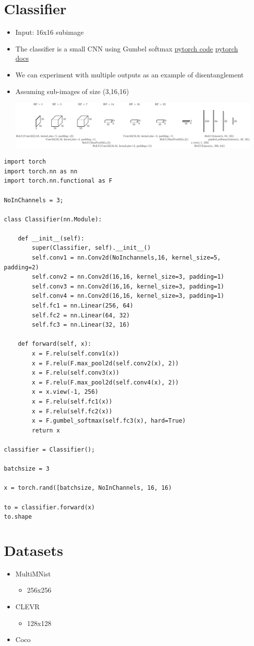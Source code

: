 \documentclass[11pt]{article}
\begin{document}
\section{Classifier}
\label{sec:orgf39c126}
\begin{itemize}
\item Input: 16x16 subimage
\item The classifier is a small CNN using Gumbel softmax
\href{https://pytorch.org/docs/stable/\_modules/torch/nn/functional.html\#gumbel\_softmax}{pytorch code}
\href{https://pytorch.org/docs/stable/nn.functional.html\#gumbel\_sofmax}{pytorch docs}
\item We can experiment with multiple outputs as an example of disentanglement
\item Assuming sub-images of size (3,16,16)
\begin{center}
\includegraphics[width=.9\linewidth]{./figures/classifier.pdf}
\end{center}
\end{itemize}

\begin{verbatim}
import torch
import torch.nn as nn
import torch.nn.functional as F

NoInChannels = 3;

class Classifier(nn.Module):

	def __init__(self):
		super(Classifier, self).__init__()
		self.conv1 = nn.Conv2d(NoInchannels,16, kernel_size=5, padding=2)
		self.conv2 = nn.Conv2d(16,16, kernel_size=3, padding=1)
		self.conv3 = nn.Conv2d(16,16, kernel_size=3, padding=1)
		self.conv4 = nn.Conv2d(16,16, kernel_size=3, padding=1)
		self.fc1 = nn.Linear(256, 64)
		self.fc2 = nn.Linear(64, 32)
		self.fc3 = nn.Linear(32, 16)

	def forward(self, x):
		x = F.relu(self.conv1(x))
		x = F.relu(F.max_pool2d(self.conv2(x), 2))
		x = F.relu(self.conv3(x))
		x = F.relu(F.max_pool2d(self.conv4(x), 2))
		x = x.view(-1, 256)
		x = F.relu(self.fc1(x))
		x = F.relu(self.fc2(x))
		x = F.gumbel_softmax(self.fc3(x), hard=True)
		return x

classifier = Classifier();

batchsize = 3

x = torch.rand([batchsize, NoInChannels, 16, 16)

to = classifier.forward(x)
to.shape
\end{verbatim}


\section{Datasets}
\label{sec:org663c67b}
\begin{itemize}
\item MultiMNist
\begin{itemize}
\item 256x256
\end{itemize}
\item CLEVR
\begin{itemize}
\item 128x128
\end{itemize}
\item Coco
\end{itemize}
\end{document}
